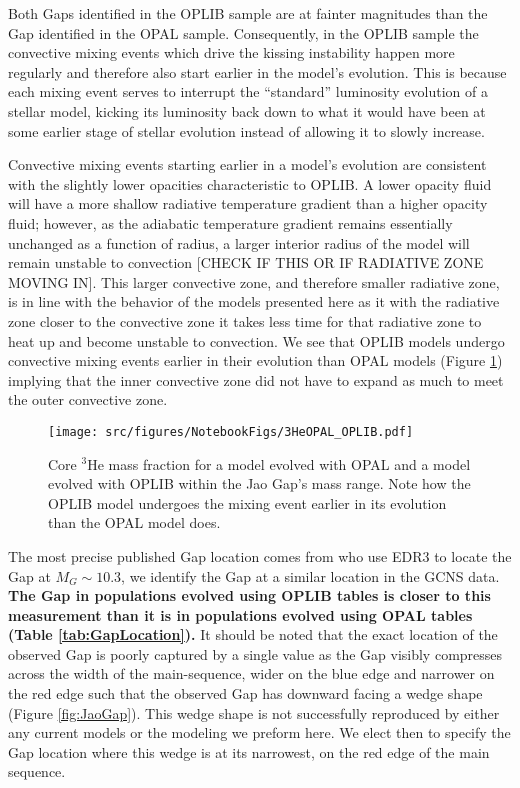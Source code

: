 Both Gaps identified in the OPLIB sample are at fainter magnitudes than the Gap
identified in the OPAL sample. Consequently, in the OPLIB sample the
convective mixing events which drive the kissing instability happen more
regularly and therefore also start earlier in the model's evolution. This is
because each mixing event serves to interrupt the ``standard'' luminosity
evolution of a stellar model, kicking its luminosity back down to what it would
have been at some earlier stage of stellar evolution instead of allowing it
to slowly increase.

Convective mixing events starting earlier in a model's evolution are consistent
with the slightly lower opacities characteristic to OPLIB. A lower opacity
fluid will have a more shallow radiative temperature gradient than a higher
opacity fluid; however, as the adiabatic temperature gradient remains
essentially unchanged as a function of radius, a larger interior radius of the
model will remain unstable to convection {\color{red}[CHECK IF THIS OR IF
RADIATIVE ZONE MOVING IN]}. This larger convective zone, and therefore smaller
radiative zone, is in line with the behavior of the models presented here as it
with the radiative zone closer to the convective zone it takes less time for
that radiative zone to heat up and become unstable to convection. We see that
OPLIB models undergo convective mixing events earlier in their evolution than
OPAL models (Figure \ref{fig:OPALOPLIB3He}) implying that the inner convective
zone did not have to expand as much to meet the outer convective zone. 

\begin{figure}
	\centering
	\texttt{[image: src/figures/NotebookFigs/3HeOPAL\_OPLIB.pdf]}
	\caption{Core $^{3}$He mass fraction for a model evolved with OPAL and a
	model evolved with OPLIB within the Jao Gap's mass range. Note how the
	OPLIB model undergoes the mixing event earlier in its evolution than the
	OPAL model does.}
	\label{fig:OPALOPLIB3He}
\end{figure}

The most precise published Gap location comes from \citet{Jao2020} who use EDR3
to locate the Gap at $M_{G} \sim 10.3$, we identify the Gap at a similar
location in the GCNS data. \textbf{The Gap in populations evolved using OPLIB tables
is closer to this measurement than it is in populations evolved using OPAL tables
(Table \ref{tab:GapLocation}).} It should be noted that the exact location of
the observed Gap is poorly captured by a single value as the Gap visibly
compresses across the width of the main-sequence, wider on the blue edge and
narrower on the red edge such that the observed Gap has downward facing a wedge
shape (Figure \ref{fig:JaoGap}). This wedge shape is not successfully
reproduced by either any current models or the modeling we preform here. We
elect then to specify the Gap location where this wedge is at its narrowest, on
the red edge of the main sequence.

